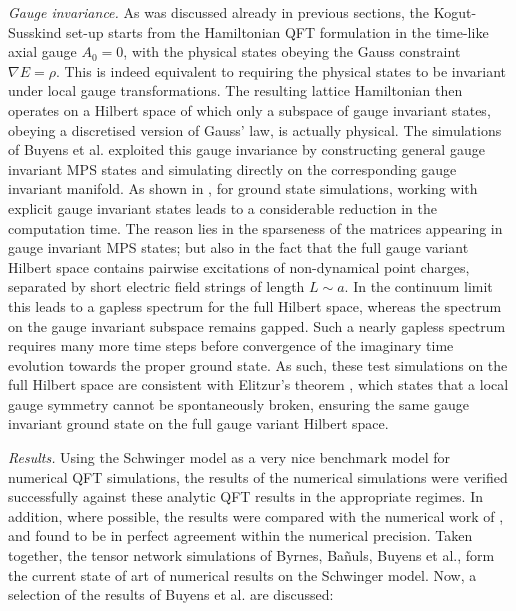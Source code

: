 \documentclass[epj,final]{svjour}
\begin{document}
\emph{Gauge invariance.} As was discussed already in previous sections, the Kogut-Susskind set-up starts from the Hamiltonian QFT formulation in the time-like axial gauge $A_0=0$, with the physical states obeying the Gauss constraint ${\nabla}E=\rho$. This is indeed equivalent to requiring the physical states to be invariant under local gauge transformations. The resulting lattice Hamiltonian then operates on a Hilbert space of which only a subspace of gauge invariant states, obeying a discretised version of Gauss' law, is actually physical. The simulations of Buyens et al. exploited this gauge invariance by constructing general gauge invariant MPS states \cite{buyens2014matrix} and simulating directly on the corresponding gauge invariant manifold. As shown in \cite{buyens2014pos}, for ground state simulations, working with explicit gauge invariant states leads to a considerable reduction in the computation time. The reason lies in the sparseness of the matrices appearing in gauge invariant MPS states; but also in the fact that the full gauge variant Hilbert space contains pairwise excitations of non-dynamical point charges, separated by short electric field strings of length $L\sim a$. In the continuum limit this leads to a gapless spectrum for the full Hilbert space, whereas the spectrum on the gauge invariant subspace remains gapped. Such a nearly gapless spectrum requires many more time steps before convergence of the imaginary time evolution towards the proper ground state. As such, these test simulations on the full Hilbert space \cite{buyens2014pos} are consistent with Elitzur's theorem \cite{Elitzur1975}, which states that a local gauge symmetry cannot be spontaneously broken, ensuring the same gauge invariant ground state on the full gauge variant Hilbert space.  

\emph{Results.} Using the Schwinger model \cite{Coleman1976,Adam1996} as a very nice benchmark model for numerical QFT simulations, the results of the numerical simulations \cite{buyens2014matrix,buyens2014pos,Buyens2015,Buyens2015b,Buyens2016,Buyens2017,Buyens2017b} were verified successfully against these analytic QFT results in the appropriate regimes. In addition, where possible, the results were compared with the numerical work of \cite{Byrnes2002, Byrnes2002b, Banuls2013}, and found to be in perfect agreement within the numerical precision. Taken together, the tensor network simulations of Byrnes, Ba{\~n}uls, Buyens et al., form the current state of art of numerical results on the Schwinger model. Now, a selection of the results of Buyens et al. are discussed:
\end{document}
